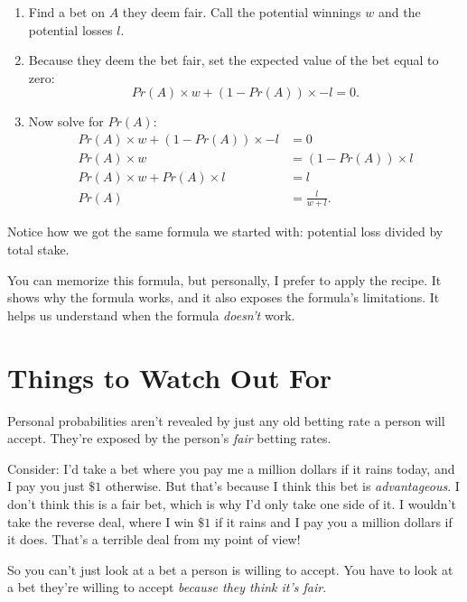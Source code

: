 \documentclass[justified]{tufte-book}
\providecommand{\tightlist}{%
  \setlength{\itemsep}{0pt}\setlength{\parskip}{0pt}}
\newcommand{\p}{Pr}
\theoremstyle{definition}
\theoremstyle{definition}
\theoremstyle{definition}
\theoremstyle{definition}
\theoremstyle{remark}
\begin{document}
\begin{enumerate}
\def\labelenumi{\arabic{enumi}.}
\tightlist
\item
  Find a bet on \(A\) they deem fair. Call the potential winnings \(w\) and the potential losses \(l\).
\item
  Because they deem the bet fair, set the expected value of the bet equal to zero:
  \[ \p(A) \times w + (1-\p(A)) \times -l = 0. \]
\item
  Now solve for \(\p(A)\):
  \[
     \begin{aligned}
       \p(A) \times w + (1-\p(A)) \times -l &= 0 \\
                             \p(A) \times w &= (1-\p(A)) \times l \\
            \p(A) \times w + \p(A) \times l &= l \\
                                      \p(A) &= \frac{l}{w + l}.
     \end{aligned}
   \]
\end{enumerate}

Notice how we got the same formula we started with: potential loss divided by total stake.

You can memorize this formula, but personally, I prefer to apply the recipe. It shows why the formula works, and it also exposes the formula's limitations. It helps us understand when the formula \emph{doesn't} work.

\hypertarget{things-to-watch-out-for}{%
\section{Things to Watch Out For}\label{things-to-watch-out-for}}

Personal probabilities aren't revealed by just any old betting rate a person will accept. They're exposed by the person's \emph{fair} betting rates.

Consider: I'd take a bet where you pay me a million dollars if it rains today, and I pay you just \(\$1\) otherwise. But that's because I think this bet is \emph{advantageous}. I don't think this is a fair bet, which is why I'd only take one side of it. I wouldn't take the reverse deal, where I win \(\$1\) if it rains and I pay you a million dollars if it does. That's a terrible deal from my point of view!

So you can't just look at a bet a person is willing to accept. You have to look at a bet they're willing to accept \emph{because they think it's fair}.
\end{document}
